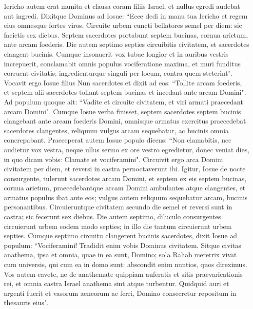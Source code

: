 \begin{biblechapter}  
\verse Iericho autem erat munita et clausa coram filiis Israel, et nullus egredi audebat aut ingredi. 
\verse Dixitque Dominus ad Iosue: “Ecce dedi in manu tua Iericho et regem eius omnesque fortes viros. 
\verse Circuite urbem cuncti bellatores semel per diem: sic facietis sex diebus. 
\verse Septem sacerdotes portabunt septem bucinas, cornua arietum, ante arcam foederis. Die autem septimo septies circuibitis civitatem, et sacerdotes clangent bucinis. 
\verse Cumque insonuerit vox tubae longior et in auribus vestris increpuerit, conclamabit omnis populus vociferatione maxima, et muri funditus corruent civitatis; ingredienturque singuli per locum, contra quem steterint". 
\verse Vocavit ergo Iosue filius Nun sacerdotes et dixit ad eos: “Tollite arcam foederis, et septem alii sacerdotes tollant septem bucinas et incedant ante arcam Domini". 
\verse Ad populum quoque ait: “Vadite et circuite civitatem, et viri armati praecedant arcam Domini". 
\verse Cumque Iosue verba finisset, septem sacerdotes septem bucinis clangebant ante arcam foederis Domini, 
\verse omnisque armatus exercitus praecedebat sacerdotes clangentes, reliquum vulgus arcam sequebatur, ac bucinis omnia concrepabant.  
\verse Praeceperat autem Iosue populo dicens: “Non clamabitis, nec audietur vox vestra, neque ullus sermo ex ore vestro egredietur, donec veniat dies, in quo dicam vobis: Clamate et vociferamini". 
\verse Circuivit ergo arca Domini civitatem per diem, et reversi in castra pernoctaverunt ibi. 
\verse Igitur, Iosue de nocte consurgente, tulerunt sacerdotes arcam Domini, 
\verse et septem ex eis septem bucinas, cornua arietum, praecedebantque arcam Domini ambulantes atque clangentes, et armatus populus ibat ante eos; vulgus autem reliquum sequebatur arcam, bucinis personantibus. 
\verse Circuieruntque civitatem secundo die semel et reversi sunt in castra; sic fecerunt sex diebus. 
\verse Die autem septimo, diluculo consurgentes circuierunt urbem eodem modo septies; in illo die tantum circuierunt urbem septies. 
\verse Cumque septimo circuitu clangerent bucinis sacerdotes, dixit Iosue ad populum: “Vociferamini! Tradidit enim vobis Dominus civitatem. 
\verse Sitque civitas anathema, ipsa et omnia, quae in ea sunt, Domino; sola Rahab meretrix vivat cum universis, qui cum ea in domo sunt: abscondit enim nuntios, quos direximus. 
\verse Vos autem cavete, ne de anathemate quippiam auferatis et sitis praevaricationis rei, et omnia castra Israel anathema sint atque turbentur. 
\verse Quidquid auri et argenti fuerit et vasorum aeneorum ac ferri, Domino consecretur repositum in thesauris eius". 

\end{biblechapter}

